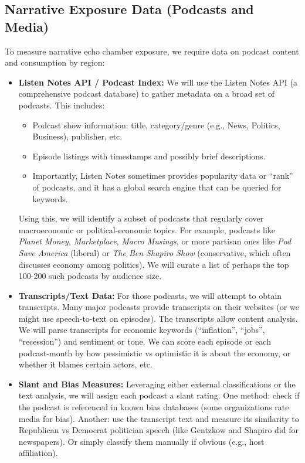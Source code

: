 \documentclass[12pt]{article}
\begin{document}
\subsection{Narrative Exposure Data (Podcasts and Media)}
To measure narrative echo chamber exposure, we require data on podcast content and consumption by region:
\begin{itemize}
    \item \textbf{Listen Notes API / Podcast Index:} We will use the Listen Notes API (a comprehensive podcast database) to gather metadata on a broad set of podcasts. This includes:
          \begin{itemize}
              \item Podcast show information: title, category/genre (e.g., News, Politics, Business), publisher, etc.
              \item Episode listings with timestamps and possibly brief descriptions.
              \item Importantly, Listen Notes sometimes provides popularity data or ``rank'' of podcasts, and it has a global search engine that can be queried for keywords.
          \end{itemize}
          Using this, we will identify a subset of podcasts that regularly cover macroeconomic or political-economic topics. For example, podcasts like \textit{Planet Money}, \textit{Marketplace}, \textit{Macro Musings}, or more partisan ones like \textit{Pod Save America} (liberal) or \textit{The Ben Shapiro Show} (conservative, which often discusses economy among politics). We will curate a list of perhaps the top 100-200 such podcasts by audience size.
    \item \textbf{Transcripts/Text Data:} For those podcasts, we will attempt to obtain transcripts. Many major podcasts provide transcripts on their websites (or we might use speech-to-text on episodes). The transcripts allow content analysis. We will parse transcripts for economic keywords (``inflation'', ``jobs'', ``recession'') and sentiment or tone. We can score each episode or each podcast-month by how pessimistic vs optimistic it is about the economy, or whether it blames certain actors, etc.
    \item \textbf{Slant and Bias Measures:} Leveraging either external classifications or the text analysis, we will assign each podcast a slant rating. One method: check if the podcast is referenced in known bias databases (some organizations rate media for bias). Another: use the transcript text and measure its similarity to Republican vs Democrat politician speech (like Gentzkow and Shapiro did for newspapers). Or simply classify them manually if obvious (e.g., host affiliation).

\end{itemize}
\end{document}
